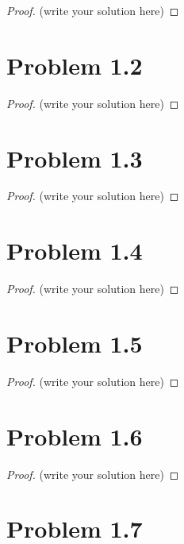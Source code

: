 \documentclass[12pt]{article}
\begin{document}
\begin{proof}
	(write your solution here)
\end{proof}

\newpage 

\section{Problem 1.2}

\begin{proof}
	(write your solution here)
\end{proof}

\newpage 

\section{Problem 1.3}

\begin{proof}
	(write your solution here)
\end{proof}

\newpage 

\section{Problem 1.4}

\begin{proof}
	(write your solution here)
\end{proof}

\newpage 

\section{Problem 1.5}

\begin{proof}
	(write your solution here)
\end{proof}

\newpage 

\section{Problem 1.6}

\begin{proof}
	(write your solution here)
\end{proof}

\newpage 

\section{Problem 1.7}
\end{document}
